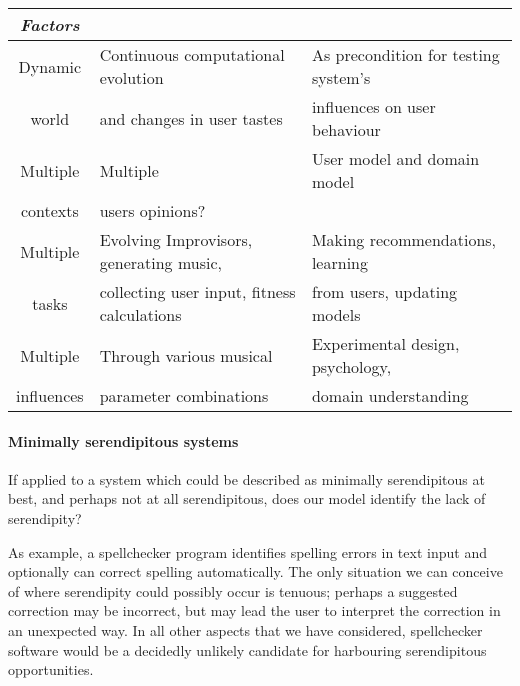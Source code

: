 \begin{table}[ht]
\begin{center}
\begin{tabular}{|c|l|l|}
{\em Factors} && \\
\hline
\hline
Dynamic & Continuous computational evolution& As precondition for testing system's \\
 world & \hspace{3mm}and changes in user tastes & \hspace{3mm} influences on user behaviour\\
\hline
Multiple & Multiple & User model and domain model\\
contexts & \hspace{3mm}users opinions? & \\
\hline
Multiple & Evolving Improvisors, generating music,  & Making recommendations, learning\\
 tasks & \hspace{3mm}collecting user input, fitness calculations& \hspace{3mm}from users, updating models \\
\hline
Multiple & Through various musical& Experimental design, psychology, \\
influences &\hspace{3mm}parameter combinations& \hspace{3mm} domain understanding\\
\hline
\end{tabular}
\end{center}
\label{caseStudies}
\end{table}%
\normalsize


\paragraph{Minimally serendipitous systems}

If applied to a system which could be described as minimally serendipitous at best, and perhaps not at all serendipitous, does our model identify the lack of serendipity?

As example, a spellchecker program identifies spelling errors in text input and optionally can correct spelling automatically. The only situation we can conceive of where serendipity could possibly occur is tenuous; perhaps a suggested correction may be incorrect, but may lead the user to interpret the correction in an unexpected way. In all other aspects that we have considered, spellchecker software would be a decidedly unlikely candidate for harbouring serendipitous opportunities.

